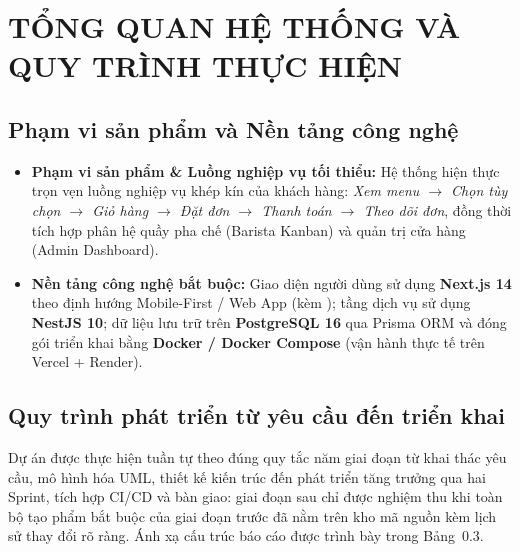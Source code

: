 \documentclass[12pt,a4paper]{report}
\begin{document}
\newpage
\tableofcontents
\newpage

\chapter*{TỔNG QUAN HỆ THỐNG VÀ QUY TRÌNH THỰC HIỆN}

\section*{Phạm vi sản phẩm và Nền tảng công nghệ}

\begin{itemize}[leftmargin=*]
\item \textbf{Phạm vi sản phẩm \& Luồng nghiệp vụ tối thiểu:} Hệ thống hiện thực trọn vẹn luồng nghiệp vụ khép kín của khách hàng: \textit{Xem menu $\rightarrow$ Chọn tùy chọn $\rightarrow$ Giỏ hàng $\rightarrow$ Đặt đơn $\rightarrow$ Thanh toán $\rightarrow$ Theo dõi đơn}, đồng thời tích hợp phân hệ quầy pha chế (Barista Kanban) và quản trị cửa hàng (Admin Dashboard).
\item \textbf{Nền tảng công nghệ bắt buộc:} Giao diện người dùng sử dụng \textbf{Next.js 14} theo định hướng Mobile-First / Web App (kèm ); tầng dịch vụ sử dụng \textbf{NestJS 10}; dữ liệu lưu trữ trên \textbf{PostgreSQL 16} qua Prisma ORM và đóng gói triển khai bằng \textbf{Docker / Docker Compose} (vận hành thực tế trên Vercel + Render).
\end{itemize}

\section*{Quy trình phát triển từ yêu cầu đến triển khai}

Dự án được thực hiện tuần tự theo đúng quy tắc năm giai đoạn từ khai thác yêu cầu, mô hình hóa UML, thiết kế kiến trúc đến phát triển tăng trưởng qua hai Sprint, tích hợp CI/CD và bàn giao: giai đoạn sau chỉ được nghiệm thu khi toàn bộ tạo phẩm bắt buộc của giai đoạn trước đã nằm trên kho mã nguồn kèm lịch sử thay đổi rõ ràng. Ánh xạ cấu trúc báo cáo được trình bày trong Bảng~0.3.
\end{document}
